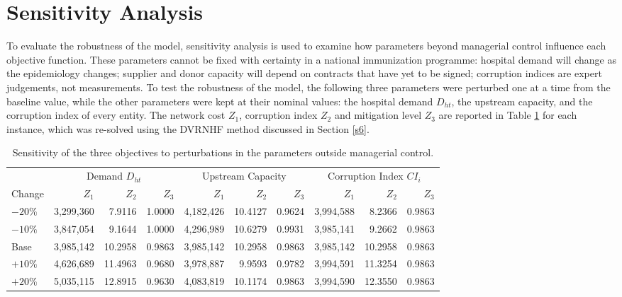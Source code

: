 \documentclass[a4paper]{elsarticle}
\begin{document}
{\section{Sensitivity Analysis}
\label{s8}
To evaluate the robustness of the model, sensitivity analysis is used to examine how parameters beyond managerial control influence each objective function. These parameters cannot be fixed with certainty in a national immunization programme: hospital demand will change as the epidemiology changes; supplier and donor capacity will depend on contracts that have yet to be signed; corruption indices are expert judgements, not measurements. To test the robustness of the model, the following three parameters were perturbed one at a time from the baseline value, while the other parameters were kept at their nominal values: the hospital demand $D_{ht}$, the upstream capacity, and the corruption index of every entity. The network cost $Z_1$, corruption index $Z_2$ and mitigation level $Z_3$ are reported in Table \ref{tab:sens} for each instance, which was re-solved using the DVRNHF method discussed in Section \ref{s6}.\\
\begin{table}[h]
\centering
\small
\caption{Sensitivity of the three objectives to perturbations in the parameters outside managerial control.}
\label{tab:sens}
\begin{tabular}{lrrrrrrrrr}
\hline
 & \multicolumn{3}{c}{Demand $D_{ht}$} & \multicolumn{3}{c}{Upstream Capacity} & \multicolumn{3}{c}{Corruption Index $CI_i$} \\
\cline{2-4}\cline{5-7}\cline{8-10}
Change & $Z_1$ & $Z_2$ & $Z_3$ & $Z_1$ & $Z_2$ & $Z_3$ & $Z_1$ & $Z_2$ & $Z_3$ \\
\hline
$-20\%$ & 3,299,360 & 7.9116 & 1.0000 & 4,182,426 & 10.4127 & 0.9624 & 3,994,588 & 8.2366 & 0.9863 \\
$-10\%$ & 3,847,054 & 9.1644 & 1.0000 & 4,296,989 & 10.6279 & 0.9931 & 3,985,141 & 9.2662 & 0.9863 \\
Base & 3,985,142 & 10.2958 & 0.9863 & 3,985,142 & 10.2958 & 0.9863 & 3,985,142 & 10.2958 & 0.9863 \\
$+10\%$ & 4,626,689 & 11.4963 & 0.9680 & 3,978,887 & 9.9593 & 0.9782 & 3,994,591 & 11.3254 & 0.9863 \\
$+20\%$ & 5,035,115 & 12.8915 & 0.9630 & 4,083,819 & 10.1174 & 0.9863 & 3,994,590 & 12.3550 & 0.9863 \\
\hline
\end{tabular}
\end{table}

}
\end{document}

